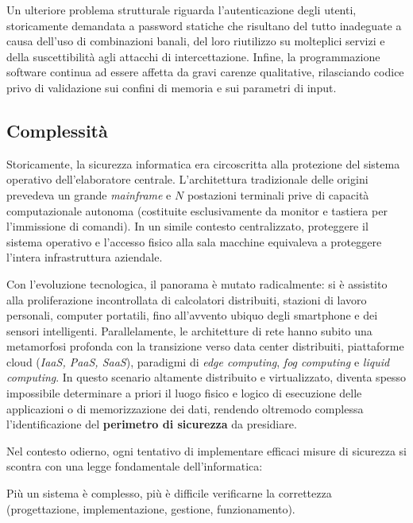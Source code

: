 \documentclass[../../main.tex]{subfiles}
\begin{document}
Un ulteriore problema strutturale riguarda l'autenticazione degli utenti, storicamente demandata a password statiche che risultano del tutto inadeguate a causa dell'uso di combinazioni banali, del loro riutilizzo su molteplici servizi e della suscettibilità agli attacchi di intercettazione. Infine, la programmazione software continua ad essere affetta da gravi carenze qualitative, rilasciando codice privo di validazione sui confini di memoria e sui parametri di input.

\subsection{Complessità}
\label{subsec:complessita}

Storicamente, la sicurezza informatica era circoscritta alla protezione del sistema operativo dell'elaboratore centrale. L'architettura tradizionale delle origini prevedeva un grande \textit{mainframe} e $N$ postazioni terminali prive di capacità computazionale autonoma (costituite esclusivamente da monitor e tastiera per l'immissione di comandi). In un simile contesto centralizzato, proteggere il sistema operativo e l'accesso fisico alla sala macchine equivaleva a proteggere l'intera infrastruttura aziendale.

Con l'evoluzione tecnologica, il panorama è mutato radicalmente: si è assistito alla proliferazione incontrollata di calcolatori distribuiti, stazioni di lavoro personali, computer portatili, fino all'avvento ubiquo degli smartphone e dei sensori intelligenti. Parallelamente, le architetture di rete hanno subito una metamorfosi profonda con la transizione verso data center distribuiti, piattaforme cloud (\textit{IaaS, PaaS, SaaS}), paradigmi di \textit{edge computing}, \textit{fog computing} e \textit{liquid computing}. In questo scenario altamente distribuito e virtualizzato, diventa spesso impossibile determinare a priori il luogo fisico e logico di esecuzione delle applicazioni o di memorizzazione dei dati, rendendo oltremodo complessa l'identificazione del \textbf{perimetro di sicurezza} da presidiare.

Nel contesto odierno, ogni tentativo di implementare efficaci misure di sicurezza si scontra con una legge fondamentale dell'informatica:
\begin{definition}
Più un sistema è complesso, più è difficile verificarne la correttezza (progettazione, implementazione, gestione, funzionamento).
\end{definition}
\end{document}

